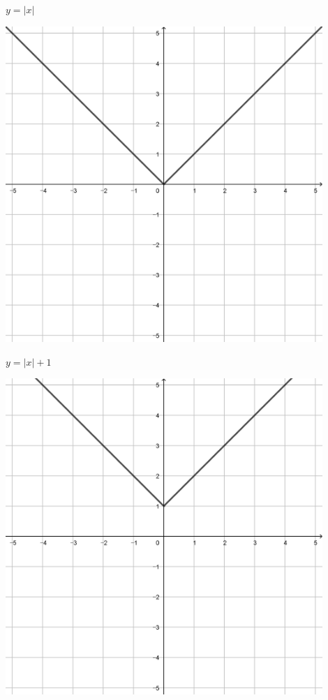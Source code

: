 \documentclass[a4paper]{oblivoir}
\begin{document}
\clearpage
\begin{minipage}{0.45\textwidth}\centering
\(y=|x|\)
\par\bigskip\includegraphics[width=0.9\textwidth]{img/15-1}
\end{minipage}
\begin{minipage}{0.45\textwidth}\centering
\(y=|x|+1\)
\par\bigskip\includegraphics[width=0.9\textwidth]{img/15-2}
\end{minipage}\bigskip\bigskip\par
\end{document}
